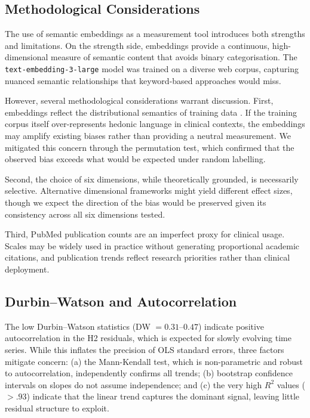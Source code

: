 \documentclass[12pt,a4paper]{article}
\begin{document}
\subsection{Methodological Considerations}

The use of semantic embeddings as a measurement tool introduces both strengths and limitations.
On the strength side, embeddings provide a continuous, high-dimensional measure of semantic content that avoids binary categorisation.
The \texttt{text-embedding-3-large} model was trained on a diverse web corpus, capturing nuanced semantic relationships that keyword-based approaches would miss.

However, several methodological considerations warrant discussion.
First, embeddings reflect the distributional semantics of training data \citep{bender2021dangers}.
If the training corpus itself over-represents hedonic language in clinical contexts, the embeddings may amplify existing biases rather than providing a neutral measurement.
We mitigated this concern through the permutation test, which confirmed that the observed bias exceeds what would be expected under random labelling.

Second, the choice of six dimensions, while theoretically grounded, is necessarily selective.
Alternative dimensional frameworks might yield different effect sizes, though we expect the direction of the bias would be preserved given its consistency across all six dimensions tested.

Third, PubMed publication counts are an imperfect proxy for clinical usage.
Scales may be widely used in practice without generating proportional academic citations, and publication trends reflect research priorities rather than clinical deployment.

\subsection{Durbin--Watson and Autocorrelation}

The low Durbin--Watson statistics (DW $= 0.31$--$0.47$) indicate positive autocorrelation in the H2 residuals, which is expected for slowly evolving time series.
While this inflates the precision of OLS standard errors, three factors mitigate concern: (a) the Mann-Kendall test, which is non-parametric and robust to autocorrelation, independently confirms all trends; (b) bootstrap confidence intervals on slopes do not assume independence; and (c) the very high $R^2$ values ($> .93$) indicate that the linear trend captures the dominant signal, leaving little residual structure to exploit.
\end{document}
